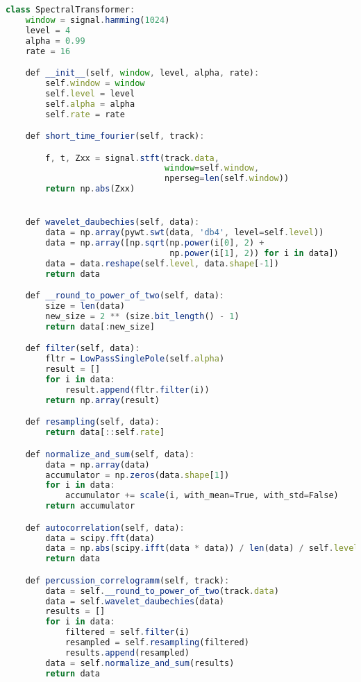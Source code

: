 \begin{lstlisting}[language=TypeScript, basicstyle=\small\ttfamily]
class SpectralTransformer:
    window = signal.hamming(1024)
    level = 4
    alpha = 0.99
    rate = 16

    def __init__(self, window, level, alpha, rate):
        self.window = window
        self.level = level
        self.alpha = alpha
        self.rate = rate

    def short_time_fourier(self, track):

        f, t, Zxx = signal.stft(track.data,
                                window=self.window,
                                nperseg=len(self.window))
        return np.abs(Zxx)


    def wavelet_daubechies(self, data):
        data = np.array(pywt.swt(data, 'db4', level=self.level))
        data = np.array([np.sqrt(np.power(i[0], 2) +
                                 np.power(i[1], 2)) for i in data])
        data = data.reshape(self.level, data.shape[-1])
        return data

    def __round_to_power_of_two(self, data):
        size = len(data)
        new_size = 2 ** (size.bit_length() - 1)
        return data[:new_size]

    def filter(self, data):
        fltr = LowPassSinglePole(self.alpha)
        result = []
        for i in data:
            result.append(fltr.filter(i))
        return np.array(result)

    def resampling(self, data):
        return data[::self.rate]

    def normalize_and_sum(self, data):
        data = np.array(data)
        accumulator = np.zeros(data.shape[1])
        for i in data:
            accumulator += scale(i, with_mean=True, with_std=False)
        return accumulator

    def autocorrelation(self, data):
        data = scipy.fft(data)
        data = np.abs(scipy.ifft(data * data)) / len(data) / self.level
        return data

    def percussion_correlogramm(self, track):
        data = self.__round_to_power_of_two(track.data)
        data = self.wavelet_daubechies(data)
        results = []
        for i in data:
            filtered = self.filter(i)
            resampled = self.resampling(filtered)
            results.append(resampled)
        data = self.normalize_and_sum(results)
        return data

\end{lstlisting}

\newpage
{}